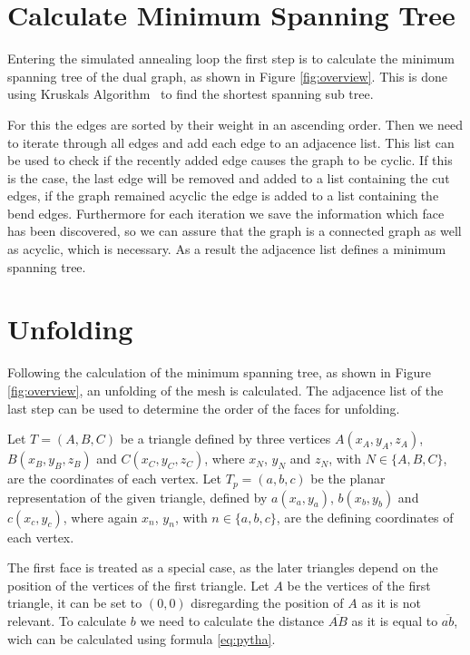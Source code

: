 \documentclass[draft,final]{vutinfth} %
\begin{document}
\section{Calculate Minimum Spanning Tree}

Entering the simulated annealing loop the first step is to calculate the minimum spanning tree of the dual graph, as shown in Figure \ref{fig:overview}. This is done using Kruskals Algorithm~\cite{kruskal1956shortest} to find the shortest spanning sub tree.

For this the edges are sorted by their weight in an ascending order. Then we need to iterate through all edges and add each edge to an adjacence list. This list can be used to check if the recently added edge causes the graph to be cyclic. If this is the case, the last edge will be removed and added to a list containing the cut edges, if the graph remained acyclic the edge is added to a list containing the bend edges. Furthermore for each iteration we save the information which face has been discovered, so we can assure that the graph is a connected graph as well as acyclic, which is necessary. As a result the adjacence list defines a minimum spanning tree.

\section{Unfolding}
\label{sec:unfold}
Following the calculation of the minimum spanning tree, as shown in Figure \ref{fig:overview}, an unfolding of the mesh is calculated. The adjacence list of the last step can be used to determine the order of the faces for unfolding.

Let $T = (A,B,C)$ be a triangle defined by three vertices $A(x_A, y_A, z_A)$, $B(x_B, y_B, z_B)$ and $C(x_C, y_C, z_C)$, where $x_N$, $y_N$ and $z_N$, with $N \in \{A,B,C\}$, are the coordinates of each vertex. Let $T_p = (a, b, c)$ be the planar representation of the given triangle, defined by $a(x_a, y_a)$, $b(x_b, y_b)$ and $c(x_c, y_c)$, where again $x_n$, $y_n$, with $n \in \{a,b,c\}$, are the defining coordinates of each vertex.

The first face is treated as a special case, as the later triangles depend on the position of the vertices of the first triangle. Let $A$ be the vertices of the first triangle, it can be set to $(0,0)$ disregarding the position of $A$ as it is not relevant. To calculate $b$ we need to calculate the distance $\overline{AB}$ as it is equal to $\overline{ab}$, wich can be calculated using formula \ref{eq:pytha}.
\end{document}
